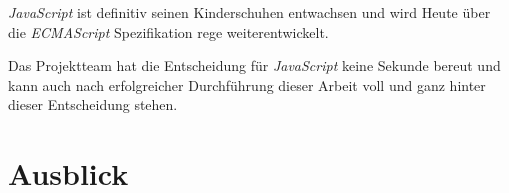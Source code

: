 \emph{JavaScript} ist definitiv seinen Kinderschuhen entwachsen und wird Heute über die \emph{ECMAScript} Spezifikation rege weiterentwickelt.

Das Projektteam hat die Entscheidung für \emph{JavaScript} keine Sekunde bereut und kann auch nach erfolgreicher Durchführung dieser Arbeit voll und ganz hinter dieser Entscheidung stehen.


\section*{Ausblick}


